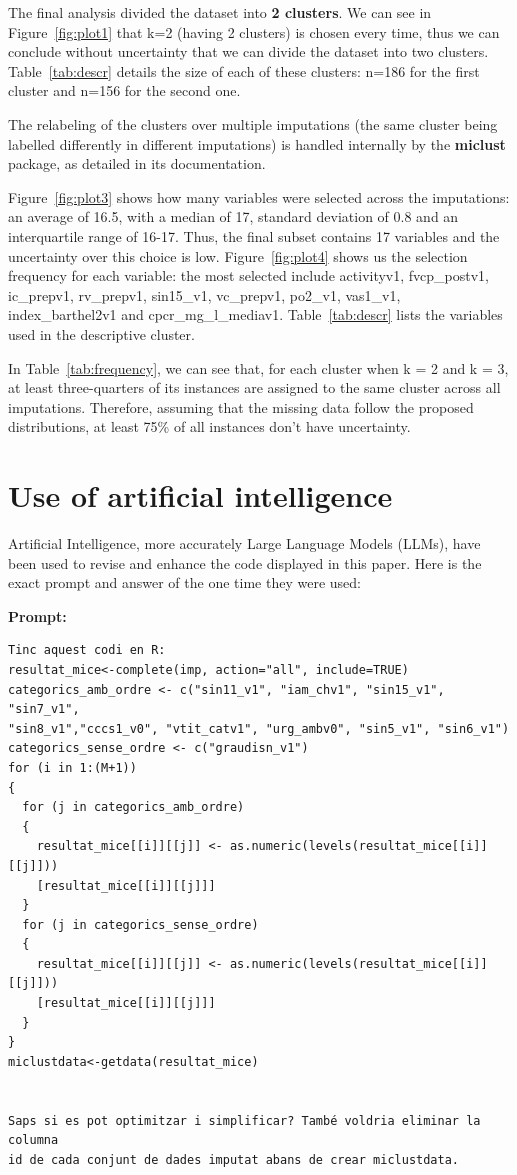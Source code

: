 \documentclass[a4paper,10pt]{article}\usepackage[]{graphicx}\usepackage[]{xcolor}
\begin{document}
The final analysis divided the dataset into \textbf{2 clusters}. We can see in
Figure~\ref{fig:plot1} that k=2 (having 2 clusters) is chosen every time, thus we can
conclude without uncertainty that we can divide the dataset into two clusters.
Table~\ref{tab:descr} details the size of each of these clusters: n=186 for the first
cluster and n=156 for the second one.

The relabeling of the clusters over multiple imputations (the same cluster being
labelled differently in different imputations) is handled internally by the
\textbf{miclust} package, as detailed in its documentation. \cite{source_code}

Figure~\ref{fig:plot3} shows how many variables were selected across the
imputations: an average of 16.5, with a median of 17, standard deviation of
0.8 and an interquartile range of 16-17. Thus, the final subset contains 17
variables and the uncertainty over this choice is low.
Figure~\ref{fig:plot4} shows us the selection frequency for each variable: the
most selected include activityv1, fvcp\_postv1, ic\_prepv1, rv\_prepv1, sin15\_v1,
vc\_prepv1, po2\_v1, vas1\_v1, index\_barthel2v1 and cpcr\_mg\_l\_mediav1. Table~\ref{tab:descr}
lists the variables used in the descriptive cluster.

In Table~\ref{tab:frequency}, we can see that, for each cluster when k = 2 and k = 3, at least
three-quarters of its instances are assigned to the same cluster across all imputations. 
Therefore, assuming that the missing data follow the proposed distributions, at least 75\% 
of all instances don't have uncertainty.




\section{Use of artificial intelligence}

Artificial Intelligence, more accurately Large Language Models (LLMs), have been
used to revise and enhance the code displayed in this paper. Here is the exact
prompt and answer of the one time they were used:

\textbf{Prompt:} 

\begin{verbatim}
Tinc aquest codi en R:
resultat_mice<-complete(imp, action="all", include=TRUE)
categorics_amb_ordre <- c("sin11_v1", "iam_chv1", "sin15_v1", "sin7_v1",
"sin8_v1","cccs1_v0", "vtit_catv1", "urg_ambv0", "sin5_v1", "sin6_v1")
categorics_sense_ordre <- c("graudisn_v1")
for (i in 1:(M+1))
{
  for (j in categorics_amb_ordre)
  {
    resultat_mice[[i]][[j]] <- as.numeric(levels(resultat_mice[[i]][[j]]))
    [resultat_mice[[i]][[j]]]
  }
  for (j in categorics_sense_ordre)
  {
    resultat_mice[[i]][[j]] <- as.numeric(levels(resultat_mice[[i]][[j]]))
    [resultat_mice[[i]][[j]]]
  }
}
miclustdata<-getdata(resultat_mice)


Saps si es pot optimitzar i simplificar? També voldria eliminar la columna
id de cada conjunt de dades imputat abans de crear miclustdata.
\end{verbatim}
\end{document}
